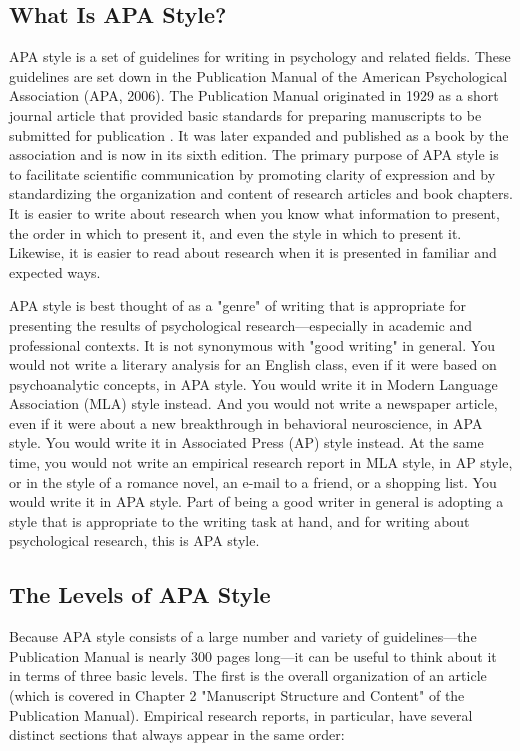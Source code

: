 \subsection{What Is APA Style?}

APA style is a set of guidelines for writing in psychology and related fields. These guidelines are set down in the Publication Manual of the American Psychological Association (APA, 2006). The Publication Manual originated in 1929 as a short journal article that provided basic standards for preparing manuscripts to be submitted for publication \citep{bentley_instructions_1929}. It was later expanded and published as a book by the association and is now in its sixth edition. The primary purpose of APA style is to facilitate scientific communication by promoting clarity of expression and by standardizing the organization and content of research articles and book chapters. It is easier to write about research when you know what information to present, the order in which to present it, and even the style in which to present it. Likewise, it is easier to read about research when it is presented in familiar and expected ways.

APA style is best thought of as a "genre" of writing that is appropriate for presenting the results of psychological research---especially in academic and professional contexts. It is not synonymous with "good writing" in general. You would not write a literary analysis for an English class, even if it were based on psychoanalytic concepts, in APA style. You would write it in Modern Language Association (MLA) style instead. And you would not write a newspaper article, even if it were about a new breakthrough in behavioral neuroscience, in APA style. You would write it in Associated Press (AP) style instead. At the same time, you would not write an empirical research report in MLA style, in AP style, or in the style of a romance novel, an e-mail to a friend, or a shopping list. You would write it in APA style. Part of being a good writer in general is adopting a style that is appropriate to the writing task at hand, and for writing about psychological research, this is APA style.

\subsection{The Levels of APA Style}

Because APA style consists of a large number and variety of guidelines---the Publication Manual is nearly 300 pages long---it can be useful to think about it in terms of three basic levels. The first is the overall organization of an article (which is covered in Chapter 2 "Manuscript Structure and Content" of the Publication Manual). Empirical research reports, in particular, have several distinct sections that always appear in the same order:


